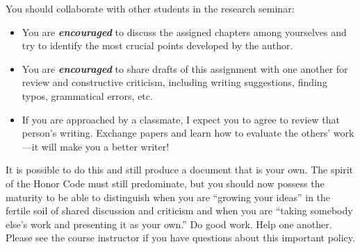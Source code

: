 You should collaborate with other students in the research seminar:

\begin{itemize}

\item You are \textit{\textbf{encouraged}} to discuss the assigned chapters among yourselves and try to identify the
  most crucial points developed by the author.

\item You are  \textit{\textbf{encouraged}} to share drafts of this assignment with one another for review and
  constructive criticism, including writing suggestions, finding typos, grammatical errors, etc.

\item If you are approached by a classmate, I expect you to agree to review that person's writing.  Exchange
  papers and learn how to evaluate the others' work---it will make you a better writer!

\end{itemize}

It is possible to do this and still produce a document that is your own. The spirit of the Honor Code must still
predominate, but you should now possess the maturity to be able to distinguish when you are ``growing your ideas'' in
the fertile soil of shared discussion and criticism and when you are ``taking somebody else's work and presenting it as
your own.'' Do good work. Help one another. Please see the course instructor if you have questions about this important policy.


